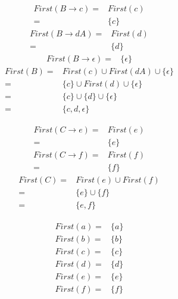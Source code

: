 \documentclass[fleqn]{article}
\begin{document}
\begin{enumerate}
  \begin{align*}
    First(B \rightarrow c) =& First(c)\\
                           =& \{c\}
  \end{align*}
  \begin{align*}
    First(B \rightarrow dA) =& First(d)\\
                            =& \{d\}
  \end{align*}
  \begin{align*}
    First(B \rightarrow \epsilon) =& \{\epsilon\}
  \end{align*}
  \begin{align*}
    First(B) =& First(c) \cup First(dA) \cup \{\epsilon\}\\
    		 =& \{c\} \cup First(d) \cup \{\epsilon\}\\
    		 =& \{c\} \cup \{d\} \cup \{\epsilon\}\\
             =& \{c, d, \epsilon\}
  \end{align*}

  \begin{align*}
    First(C \rightarrow e) =& First(e)\\
                           =& \{e\}
  \end{align*}
  \begin{align*}
    First(C \rightarrow f) =& First(f)\\
                           =& \{f\}
  \end{align*}
  \begin{align*}
    First(C) =& First(e) \cup First(f)\\
    		 =& \{e\} \cup \{f\}\\
             =& \{e, f\}
  \end{align*}

  \begin{align*}
    First(a) =& \{a\}\\
    First(b) =& \{b\}\\
    First(c) =& \{c\}\\
    First(d) =& \{d\}\\
    First(e) =& \{e\}\\
    First(f) =& \{f\}\\
  \end{align*}


\end{enumerate}
\end{document}
